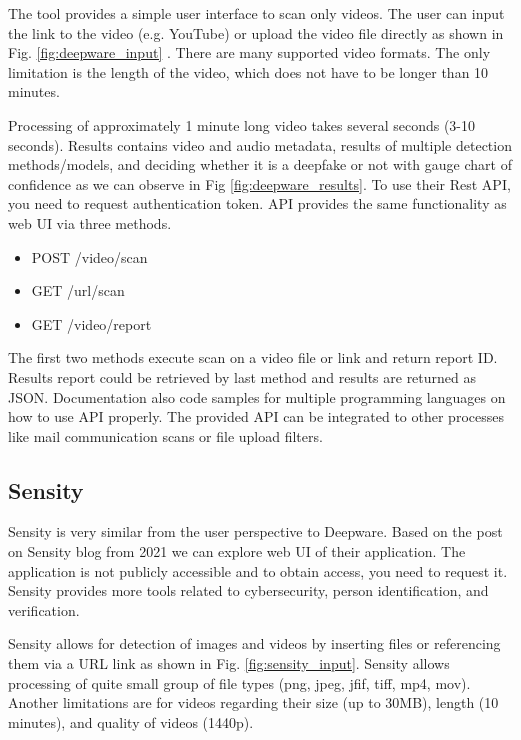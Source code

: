 The tool provides a simple user interface to scan only videos. The user can input the link to the video (e.g. YouTube) or upload the video file directly as shown in Fig. \ref{fig:deepware_input} . There are many supported video formats. The only limitation is the length of the video, which does not have to be longer than 10 minutes.

Processing of approximately 1 minute long video takes several seconds (3-10 seconds). Results contains video and audio metadata, results of multiple detection methods/models, and deciding whether it is a deepfake or not with gauge chart of confidence as we can observe in Fig \ref{fig:deepware_results}. To use their Rest API, you need to request authentication token. API provides the same functionality as web UI via three methods.

\begin{itemize}
\item POST /video/scan
\item GET /url/scan
\item GET /video/report
\end{itemize}

The first two methods execute scan on a video file or link and return report ID. Results report could be retrieved by last method and results are returned as JSON. Documentation also code samples for multiple programming languages on how to use API properly. The provided API can be integrated to other processes like mail communication scans or file upload filters.

\subsection{Sensity}

Sensity is very similar from the user perspective to Deepware. Based on the post on Sensity blog \cite{HowToDetectADeepfakeOnline} from 2021 we can explore web UI of their application. The application is not publicly accessible and to obtain access, you need to request it. Sensity provides more tools related to cybersecurity, person identification, and verification. 

Sensity allows for detection of images and videos by inserting files or referencing them via a URL link as shown in Fig. \ref{fig:sensity_input}. Sensity allows processing of quite small group of file types (png, jpeg, jfif, tiff, mp4, mov). Another limitations are for videos regarding their size (up to 30MB), length (10 minutes), and quality of videos (1440p). \cite{HowToDetectADeepfakeOnline}

